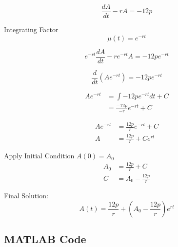 \documentclass{article}
\numberwithin{figure}{section}
\begin{document}
    \begin{equation*}
        \frac{dA}{dt} - rA = -12p
    \end{equation*}
    
    Integrating Factor
    \begin{equation*}
        \mu(t) = e^{-rt}
    \end{equation*}
    
    \begin{equation*}
        e^{-rt} \frac{dA}{dt} - r e^{-rt} A = -12p e^{-rt}
    \end{equation*}
    
    \begin{equation*}
        \frac{d}{dt} \left( A e^{-rt} \right ) = -12p e^{-rt}
    \end{equation*}
    
    \begin{align*}
        A e^{-rt} &= \int -12p e^{-rt} dt + C \\
        &= \frac{-12p}{-r} e^{-rt} + C 
    \end{align*}
    
    \begin{align*}
        A e^{-rt} &= \frac{12p}{r} e^{-rt} + C \\
        A &= \frac{12p}{r} + C e^{rt}
    \end{align*}
    
    Apply Initial Condition $A(0) = A_0$
    \begin{align*}
        A_0 &= \frac{12p}{r} + C \\
        C &= A_0 - \frac{12p}{r}
    \end{align*}
    
    Final Solution:
    \begin{equation*}
        A(t) = \frac{12p}{r} + \left( A_0 - \frac{12p}{r} \right ) e^{rt}
    \end{equation*}

\subsection{MATLAB Code}

\end{document}
